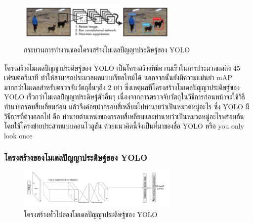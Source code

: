 \begin{figure}[!ht]
    \centering
    \includegraphics[width=0.7\textwidth]{chapter2/images/yolo.jpg}
    \caption[กระบวนการทำงานของโครงสร้างโมเดลปัญญาประดิษฐ์ของ YOLO]{กระบวนการทำงานของโครงสร้างโมเดลปัญญาประดิษฐ์ของ YOLO\textsuperscript{\cite{yolo}}}
    \label{fig:yolo}
\end{figure}

โครงสร้างโมเดลปัญญาประดิษฐ์ของ YOLO\textsuperscript{\cite{yolo}} เป็นโครงสร้างที่มีความเร็วในการประมวลผลถึง 45 เฟรมต่อวินาที ทำให้สามารถประมวลผลแบบเรียลไทม์ได้ นอกจากนั้นยังมีความแม่นยำ mAP 
มากกว่าโมเดลสำหรับตรวจจับวัตถุอื่นๆถึง 2 เท่า ซึ่งเหตุผลที่โครงสร้างโมเดลปัญญาประดิษฐ์ของ YOLO เร็วกว่าโมเดลปัญญาประดิษฐ์ตัวอื่นๆ 
เนื่องจากการตรวจจับวัตถุในวิธีการก่อนหน้าจะใช้วิธีทำนายกรอบสี่เหลี่ยมก่อน แล้วจึงค่อยนำกรอบสี่เหลี่ยมไปทำนายว่าเป็นหมวดหมู่อะไร ซึ่ง YOLO มีวิธีการที่ต่างออกไป คือ 
ทำนายตำแหน่งของกรอบสี่เหลี่ยมและทำนายว่าเป็นหมวดหมู่อะไรพร้อมกัน โดยใช้โครงข่ายประสาทแบบคอนโวลูชัน ด้วยแนวคิดนี้จึงเป็นที่มาของชื่อ YOLO 
หรือ you only look once
\subsubsection*{โครงสร้างของโมเดลปัญญาประดิษฐ์ของ YOLO} 
\begin{figure}[!ht]
    \centering
    \includegraphics[width=0.7\textwidth]{chapter2/images/yolo_architecture.jpg}
    \caption[โครงสร้างทั่วไปของโมเดลปัญญาประดิษฐ์ของ YOLO]{โครงสร้างทั่วไปของโมเดลปัญญาประดิษฐ์ของ YOLO\textsuperscript{\cite{ssd_yolo_pic}}}
    \label{fig:yolo_architecture}
\end{figure}

